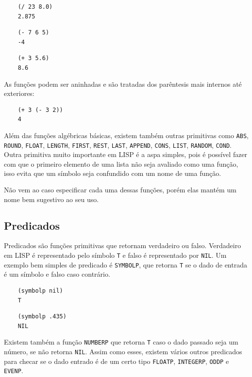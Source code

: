 \documentclass[a4paper, twoside, 12pt]{article}
\begin{document}
\begin{verbatim}
    (/ 23 8.0)
    2.875
\end{verbatim}

\begin{verbatim}
    (- 7 6 5)	
    -4
\end{verbatim}

\begin{verbatim}
    (+ 3 5.6)
    8.6
\end{verbatim}

	As funções podem ser aninhadas e são tratadas dos parêntesis mais internos até exteriores:
	
\begin{verbatim}
    (+ 3 (- 3 2))
    4
\end{verbatim}

Além das funções algébricas básicas, existem também outras primitivas como \texttt{ABS}, \texttt{ROUND}, \texttt{FLOAT}, \texttt{LENGTH}, \texttt{FIRST}, \texttt{REST}, \texttt{LAST}, \texttt{APPEND}, \texttt{CONS}, \texttt{LIST}, \texttt{RANDOM}, \texttt{COND}. Outra primitiva muito importante em LISP é a aspa simples, pois é possível fazer com que o primeiro elemento de uma lista não seja avaliado como uma função, isso evita que um símbolo seja confundido com um nome de uma função.
	
Não vem ao caso especificar cada uma dessas funções, porém elas mantém um nome bem sugestivo ao seu uso.

\subsection{Predicados}

Predicados são funções primitivas que retornam verdadeiro  ou falso. Verdadeiro em LISP é representado pelo símbolo \texttt{T} e falso é representado por \texttt{NIL}. Um exemplo bem simples de predicado é \texttt{SYMBOLP}, que retorna \texttt{T} se o dado de entrada é um símbolo e falso caso contrário.

\begin{verbatim}
    (symbolp nil)
    T
\end{verbatim}	

\begin{verbatim}
    (symbolp .435)
    NIL
\end{verbatim}

Existem também a função \texttt{NUMBERP} que retorna \texttt{T} caso o dado passado seja um número, se não retorna \texttt{NIL}. Assim como esses, existem vários outros predicados para checar se o dado entrado é de um certo tipo \texttt{FLOATP}, \texttt{INTEGERP}, \texttt{ODDP} e \texttt{EVENP}.
\end{document}

